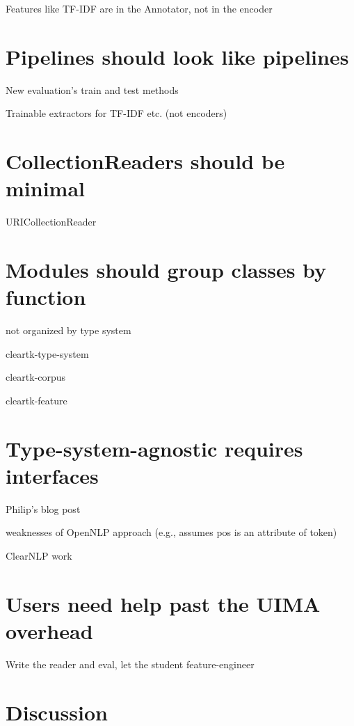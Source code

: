 \documentclass[10pt, a4paper]{article}
\begin{document}
Features like TF-IDF are in the Annotator, not in the encoder


\section{Pipelines should look like pipelines}

New evaluation's train and test methods

Trainable extractors for TF-IDF etc. (not encoders)


\section{CollectionReaders should be minimal}

URICollectionReader


\section{Modules should group classes by function}
not organized by type system

cleartk-type-system

cleartk-corpus

cleartk-feature


\section{Type-system-agnostic requires interfaces}

Philip's blog post

weaknesses of OpenNLP approach (e.g., assumes pos is an attribute of token)

ClearNLP work


\section{Users need help past the UIMA overhead}

Write the reader and eval, let the student feature-engineer


\section{Discussion}



\end{document}
